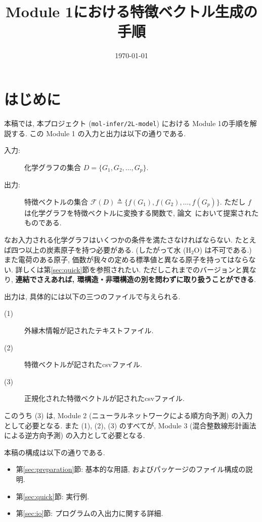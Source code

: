 \documentclass[11pt, titlepage, dvipdfmx, twoside]{jarticle}
\title{\huge Module 1における特徴ベクトル生成の手順}
\author{\project}
\newcommand{\project}{{\tt mol-infer/2L-model}}
\newcommand{\secref}[1]{第\ref{sec:#1}節}
\begin{document}
\makeatletter 
\let\c@lstlisting\c@figure
\makeatother
{}
\date{\today}
\maketitle
\thispagestyle{empty}
\tableofcontents
\clearpage
{}


\section{はじめに}
本稿では, 本プロジェクト (\project) における Module 1の手順を解説する. 
この Module 1 の入力と出力は以下の通りである. 

\begin{oframed}
\begin{description}
\item[入力:] 化学グラフの集合 $D=\{G_1,G_2,\dots,G_p\}$.
\item[出力:] 特徴ベクトルの集合 ${\mathcal F}(D)\triangleq\{f(G_1),f(G_2),\dots,f(G_p)\}$.
  ただし $f$ は化学グラフを特徴ベクトルに変換する関数で,
  論文~\cite{BH_2L-model}において提案されたものである. 
\end{description}
\end{oframed}

なお入力される化学グラフはいくつかの条件を満たさなければならない. 
たとえば四つ以上の炭素原子を持つ必要がある.
(したがって水 (H$_2$O) は不可である.)
また電荷のある原子, 価数が我々の定める標準値と異なる原子を持ってはならない.
詳しくは\secref{quick}を参照されたい.
ただしこれまでのバージョンと異なり, {\bf 連結でさえあれば,
環構造・非環構造の別を問わずに取り扱うことができる}. 

出力は, 具体的には以下の三つのファイルで与えられる.
\begin{description}
\item[(1)] 外縁木情報が記されたテキストファイル. 
\item[(2)] 特徴ベクトルが記されたcsvファイル. 
\item[(3)] 正規化された特徴ベクトルが記されたcsvファイル. 
\end{description}
このうち (3) は, Module 2 (ニューラルネットワークによる順方向予測)
の入力として必要となる. また (1), (2), (3) のすべてが,
Module 3 (混合整数線形計画法による逆方向予測) の入力として必要となる. 

本稿の構成は以下の通りである. 
\begin{itemize}
\item \secref{preparation}: 基本的な用語, およびパッケージのファイル構成の説明. 
\item \secref{quick}: 実行例. 
\item \secref{io}: プログラムの入出力に関する詳細. 
\end{itemize}
\end{document}
